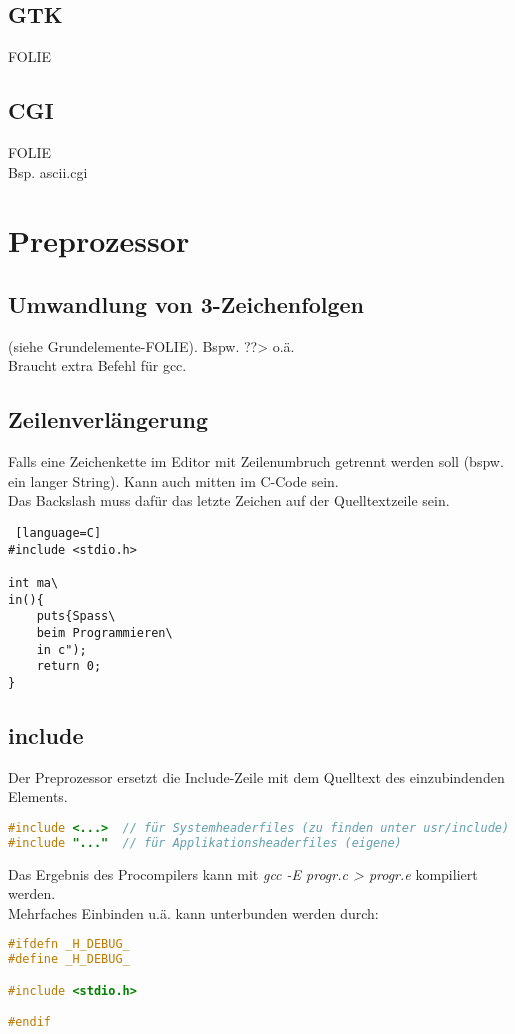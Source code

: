 \subsection{GTK}
FOLIE
\subsection{CGI}
FOLIE\\
Bsp. ascii.cgi

\section{Preprozessor}

\subsection{Umwandlung von 3-Zeichenfolgen}
(siehe Grundelemente-FOLIE). Bspw. ??> o.ä.\\
Braucht extra Befehl für gcc.

\subsection{Zeilenverlängerung}
Falls eine Zeichenkette im Editor mit Zeilenumbruch getrennt werden soll (bspw. ein langer String). Kann auch mitten im C-Code sein.\\
Das Backslash muss dafür das letzte Zeichen auf der Quelltextzeile sein.
\begin{lstlisting} [language=C]
#include <stdio.h>

int ma\
in(){
	puts{Spass\
	beim Programmieren\
	in c");
	return 0;
}
\end{lstlisting}

\subsection{include}

Der Preprozessor ersetzt die Include-Zeile mit dem Quelltext des einzubindenden Elements.
\begin{lstlisting}[language=C]
#include <...>	// für Systemheaderfiles (zu finden unter usr/include)
#include "..."	// für Applikationsheaderfiles (eigene)
\end{lstlisting}
Das Ergebnis des Procompilers kann mit \emph{gcc -E progr.c > progr.e} kompiliert werden.\\
Mehrfaches Einbinden u.ä. kann unterbunden werden durch:
\begin{lstlisting}[language=C]
#ifdefn _H_DEBUG_
#define _H_DEBUG_

#include <stdio.h>

#endif
\end{lstlisting}

